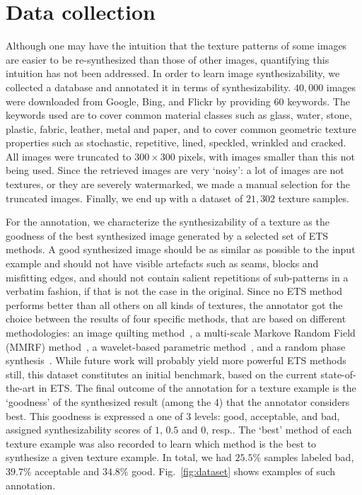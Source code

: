 \documentclass[10pt,twocolumn,letterpaper]{article}
\begin{document}

\section{Data collection}
\label{sec:data}
Although one may have the intuition that the texture patterns of some
images are easier to be re-synthesized than those of other images,
quantifying this intuition has not been addressed. In order to learn
image synthesizability, we collected a database and annotated it in
terms of synthesizability. $40,000$ images were downloaded from
Google, Bing, and Flickr by providing $60$ keywords. The keywords used are
to cover common material classes such as glass, water, stone, plastic,
fabric, leather, metal and paper, and to cover common geometric
texture properties such as stochastic, repetitive, lined, speckled,
wrinkled and cracked. All images were truncated to $300 \times 300$
pixels, with images smaller than this not being used. Since the
retrieved images are very `noisy': a lot of images are not textures,
or they are severely watermarked, we made a manual selection for the
truncated images. Finally, we end up with a dataset of $21,302$
texture samples. 

For the annotation, we characterize the synthesizability of a texture
as the goodness of the best synthesized image generated by a selected
set of ETS methods. A good synthesized image should be as similar as
possible to the input example and should not have visible artefacts
such as seams, blocks and misfitting edges, and should not contain
salient repetitions of sub-patterns in a verbatim fashion, if that is
not the case in the original. Since no ETS method performs better than
all others on all kinds of textures, the annotator got the
choice between the results of four specific methods, that are based on
different methodologies: an image quilting
method~\cite{Efros:sig2001}, a multi-scale Markove Random Field (MMRF)
method~\cite{Zalesny05}, a wavelet-based parametric
method~\cite{Portilla:2000:IJCV}, and a random phase
synthesis~\cite{random:phase}. While future work will probably yield
more powerful ETS methods still, this dataset constitutes an initial
benchmark, based on the current state-of-the-art in ETS. The final
outcome of the annotation for a texture example is the `goodness' of
the synthesized result (among the 4) that the annotator considers
best. This goodness is expressed a one of 3 levels: good, acceptable,
and bad, assigned synthesizability scores of $1$, $0.5$ and $0$,
resp..  The `best' method of each texture example was also recorded to
learn which method is the best to synthesize a given texture example.
In total, we had $25.5\%$ samples labeled bad, $39.7\%$ acceptable and
$34.8\%$ good.  Fig.~\ref{fig:dataset} shows examples of such
annotation.  
\end{document}
